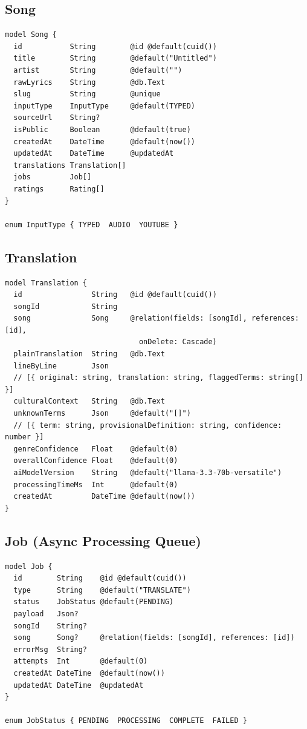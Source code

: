 \documentclass[12pt, a4paper]{article}
\begin{document}
\subsection{Song}
\begin{tcolorbox}[codebox]
\begin{lstlisting}
model Song {
  id           String        @id @default(cuid())
  title        String        @default("Untitled")
  artist       String        @default("")
  rawLyrics    String        @db.Text
  slug         String        @unique
  inputType    InputType     @default(TYPED)
  sourceUrl    String?
  isPublic     Boolean       @default(true)
  createdAt    DateTime      @default(now())
  updatedAt    DateTime      @updatedAt
  translations Translation[]
  jobs         Job[]
  ratings      Rating[]
}

enum InputType { TYPED  AUDIO  YOUTUBE }
\end{lstlisting}
\end{tcolorbox}

\subsection{Translation}
\begin{tcolorbox}[codebox]
\begin{lstlisting}
model Translation {
  id                String   @id @default(cuid())
  songId            String
  song              Song     @relation(fields: [songId], references: [id],
                               onDelete: Cascade)
  plainTranslation  String   @db.Text
  lineByLine        Json
  // [{ original: string, translation: string, flaggedTerms: string[] }]
  culturalContext   String   @db.Text
  unknownTerms      Json     @default("[]")
  // [{ term: string, provisionalDefinition: string, confidence: number }]
  genreConfidence   Float    @default(0)
  overallConfidence Float    @default(0)
  aiModelVersion    String   @default("llama-3.3-70b-versatile")
  processingTimeMs  Int      @default(0)
  createdAt         DateTime @default(now())
}
\end{lstlisting}
\end{tcolorbox}

\subsection{Job (Async Processing Queue)}
\begin{tcolorbox}[codebox]
\begin{lstlisting}
model Job {
  id        String    @id @default(cuid())
  type      String    @default("TRANSLATE")
  status    JobStatus @default(PENDING)
  payload   Json?
  songId    String?
  song      Song?     @relation(fields: [songId], references: [id])
  errorMsg  String?
  attempts  Int       @default(0)
  createdAt DateTime  @default(now())
  updatedAt DateTime  @updatedAt
}

enum JobStatus { PENDING  PROCESSING  COMPLETE  FAILED }
\end{lstlisting}
\end{tcolorbox}
\end{document}
